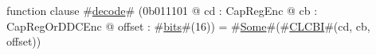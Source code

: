 function clause #\hyperref[sailMIPSzdecode]{decode}# (0b011101 @ cd : CapRegEnc @ cb : CapRegOrDDCEnc @ offset : #\hyperref[sailMIPSzbits]{bits}#(16)) = #\hyperref[sailMIPSzSome]{Some}#(#\hyperref[sailMIPSzCLCBI]{CLCBI}#(cd, cb, offset))

